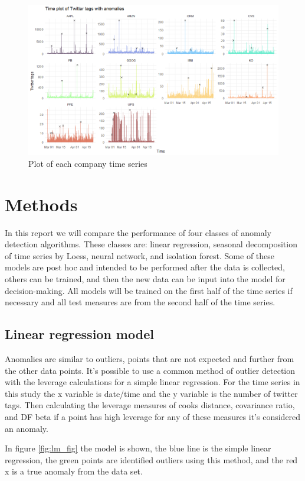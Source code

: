 \documentclass{article}
\begin{document}
\begin{figure}[hb]
    \centering
    \includegraphics[width=.7\textwidth]{data_plot.png}
    \caption{Plot of each company time series}
    \label{fig:data}
\end{figure}

\section{Methods}
In this report we will compare the performance of four classes of anomaly detection algorithms. These classes are: linear regression, seasonal decomposition of time series by Loess, neural network, and isolation forest. Some of these models are post hoc and intended to be performed after the data is collected, others can be trained, and then the new data can be input into the model for decision-making. All models will be trained on the first half of the time series if necessary and all test measures are from the second half of the time series.

\subsection{Linear regression model}
Anomalies are similar to outliers, points that are not expected and further from the other data points. It's possible to use a common method of outlier detection with the leverage calculations for a simple linear regression. For the time series in this study the x variable is date/time and the y variable is the number of twitter tags. Then calculating the leverage measures of cooks distance, covariance ratio, and DF beta if a point has high leverage for any of these measures it's considered an anomaly. 

In figure \ref{fig:lm_fig} the model is shown, the blue line is the simple linear regression, the green points are identified outliers using this method, and the red x is a true anomaly from the data set.
\end{document}
